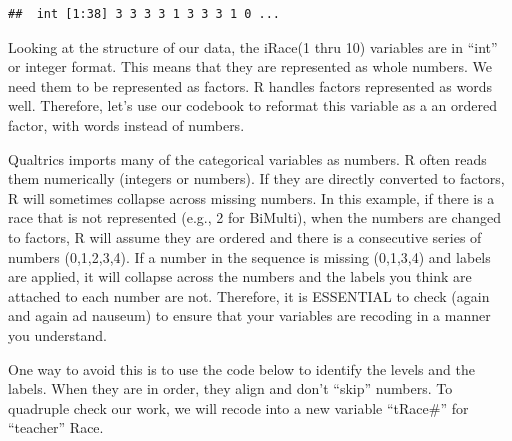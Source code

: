 \documentclass[
  english,
]{book}
\newenvironment{Shaded}{\begin{snugshade}}{\end{snugshade}}
\newcommand{\FunctionTok}[1]{\textcolor[rgb]{0.00,0.00,0.00}{#1}}
\newcommand{\NormalTok}[1]{#1}
\newcommand{\SpecialCharTok}[1]{\textcolor[rgb]{0.00,0.00,0.00}{#1}}
\begin{document}
\begin{Shaded}
\end{Shaded}

\begin{verbatim}
##  int [1:38] 3 3 3 3 1 3 3 3 1 0 ...
\end{verbatim}

Looking at the structure of our data, the iRace(1 thru 10) variables are in ``int'' or integer format. This means that they are represented as whole numbers. We need them to be represented as factors. R handles factors represented as words well. Therefore, let's use our codebook to reformat this variable as a an ordered factor, with words instead of numbers.

Qualtrics imports many of the categorical variables as numbers. R often reads them numerically (integers or numbers). If they are directly converted to factors, R will sometimes collapse across missing numbers. In this example, if there is a race that is not represented (e.g., 2 for BiMulti), when the numbers are changed to factors, R will assume they are ordered and there is a consecutive series of numbers (0,1,2,3,4). If a number in the sequence is missing (0,1,3,4) and labels are applied, it will collapse across the numbers and the labels you think are attached to each number are not. Therefore, it is ESSENTIAL to check (again and again ad nauseum) to ensure that your variables are recoding in a manner you understand.

One way to avoid this is to use the code below to identify the levels and the labels. When they are in order, they align and don't ``skip'' numbers. To quadruple check our work, we will recode into a new variable ``tRace\#'' for ``teacher'' Race.
\end{document}
